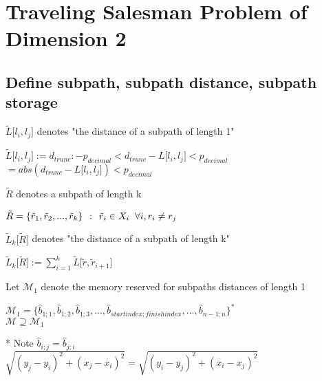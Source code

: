 \documentclass[11pt]{article}
\begin{document}
\newpage
\section*{Traveling Salesman Problem of Dimension 2}
\subsection{Define subpath, subpath distance, subpath storage}
\vspace{2mm}
$\tilde{L} \lbrack l_i,l_j \rbrack$ denotes "the distance of a subpath of length 1"
\begin{center}
$
\tilde{L} \lbrack l_i,l_j \rbrack :=d_{trunc} : -p_{decimal} < d_{trunc} - L\lbrack l_i,l_j \rbrack < p_{decimal} 
$
\\ \vspace{2mm}
$
= abs(d_{trunc} - L\lbrack l_i,l_j \rbrack) < p_{decimal} 
$
\end{center}
\vspace{4mm}
$
\tilde{R}$ denotes a subpath of length k
\begin{center}
$
\tilde{R} = \{\tilde{r}_1,\tilde{r}_2,...,\tilde{r}_k\} \hspace{1.5mm} : \hspace{1.5mm} \tilde{r}_i \in X_i \hspace{2mm} \forall i, r_i \neq r_j
$
\end{center}
\vspace{4mm}
$\tilde{L}_k\lbrack \tilde{R} \rbrack$ denotes "the distance of a subpath of length k"
\begin{center}
$
\tilde{L}_k\lbrack \tilde{R} \rbrack := \sum_{i=1}^{k} \tilde{L}\lbrack \tilde{r},\tilde{r}_{i+1}\rbrack
$ 
\end{center}
\vspace{4mm}
Let $\mathcal{M}_1$ denote the memory reserved for subpaths distances of length 1
\begin{center}
$
\mathcal{M}_1= \{\hat{b}_{1;1},\hat{b}_{1;2},\hat{b}_{1;3},...,\hat{b}_{startindex;finishindex},...,\hat{b}_{n-1;n}\}^*
$
\\ \vspace{2mm}
$
\mathcal{M} \supseteq \mathcal{M}_1
$
\end{center}
\vspace{3mm}* Note $\hat{b}_{i;j} = \hat{b}_{j;i}$\\
$\sqrt{(y_j - y_i)^2 + (x_j - x_i)^2} = \sqrt{(y_i - y_j)^2 + (x_i - x_j)^2}$
\end{document}
